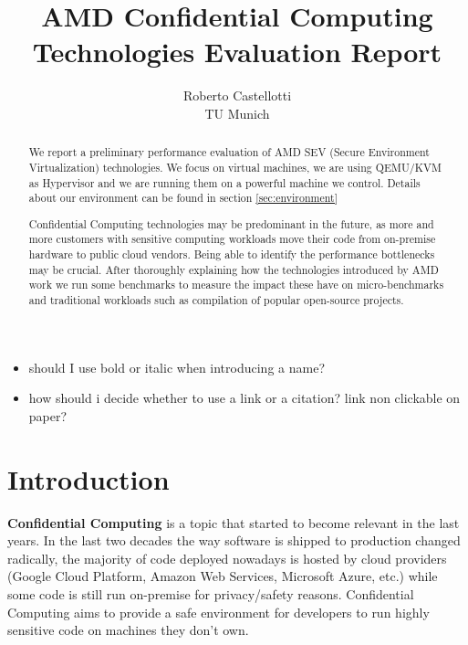 \documentclass[twocolumn]{article}
\begin{document}
\date{}
\title{\Large \bf AMD Confidential Computing Technologies Evaluation Report}
\author{{\rm Roberto Castellotti}\\TU Munich}
\maketitle


\begin{itemize}
    \item should I use bold or italic when introducing a name?
    \item how should i decide whether to use a link or a citation? link non clickable on paper?
\end{itemize}
\begin{abstract}
We report a preliminary performance evaluation of AMD SEV (Secure Environment Virtualization) technologies.
We focus on virtual machines, we are using QEMU/KVM as Hypervisor and we are running them on a powerful machine we control.
Details about our environment can be found in section \ref{sec:environment}

Confidential Computing technologies may be predominant in the future, as more and more customers with sensitive computing workloads move their code from on-premise hardware to public cloud vendors. Being able to identify the performance bottlenecks may be crucial. After thoroughly explaining how the technologies introduced by AMD work we run some benchmarks to measure the impact these have on micro-benchmarks and traditional workloads such as compilation of popular open-source projects.
\end{abstract}

\section{Introduction}

\textbf{Confidential Computing} is a topic that started to become relevant in the last years. In the last two decades the way software is shipped to production changed radically, the majority of code deployed nowadays is hosted by cloud providers (Google Cloud Platform, Amazon Web Services, Microsoft Azure, etc.) while some code is still run on-premise for privacy/safety reasons. Confidential Computing aims to provide a safe environment for developers to run highly sensitive code on machines they don't own. 
\end{document}
